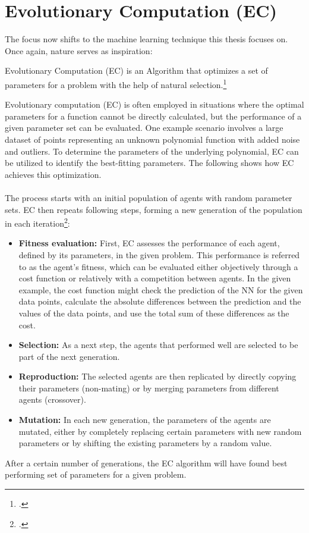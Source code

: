 \documentclass[11pt]{report}
\newcommand{\mydeflabel}{}
\newenvironment{mydef}[1]
{\renewcommand\mydeflabel{#1}\begin{mydefinner}}
{\end{mydefinner}}
\begin{document}
    \section{Evolutionary Computation (EC)}\label{sec:evolutionary-computation-(ec)-&-genetic-algorithms-(gas)}
    The focus now shifts to the machine learning technique this thesis focuses on.
    Once again, nature serves as inspiration:
    \begin{mydef}{Evolutionary Computation}
        Evolutionary Computation (EC) is an Algorithm that optimizes a set of parameters for a problem with the help of natural selection.\footcite{virtusa2024}
    \end{mydef}
    Evolutionary computation (EC) is often employed in situations where the optimal parameters for a function cannot be directly calculated, but the performance of a given parameter set can be evaluated.
    One example scenario involves a large dataset of points representing an unknown polynomial function with added noise and outliers.
    To determine the parameters of the underlying polynomial, EC can be utilized to identify the best-fitting parameters.
    The following shows how EC achieves this optimization.
    \\ \\
    The process starts with an initial population of agents with random parameter sets.
    EC then repeats following steps, forming a new generation of the population in each iteration\footcite{Sathyabama20}:
    \begin{itemize}
        \item \textbf{Fitness evaluation:} First, EC assesses the performance of each agent, defined by its parameters, in the given problem.
        This performance is referred to as the agent's fitness, which can be evaluated either objectively through a cost function or relatively with a competition between agents.
        In the given example, the cost function might check the prediction of the NN for the given data points, calculate the absolute differences between the prediction and the values of the data points, and use the total sum of these differences as the cost.
        \item \textbf{Selection:} As a next step, the agents that performed well are selected to be part of the next generation.
        \item \textbf{Reproduction:} The selected agents are then replicated by directly copying their parameters (non-mating) or by merging parameters from different agents (crossover).
        \item \textbf{Mutation:} In each new generation, the parameters of the agents are mutated, either by completely replacing certain parameters with new random parameters or by shifting the existing parameters by a random value.
    \end{itemize}
    After a certain number of generations, the EC algorithm will have found best performing set of parameters for a given problem.
\end{document}
